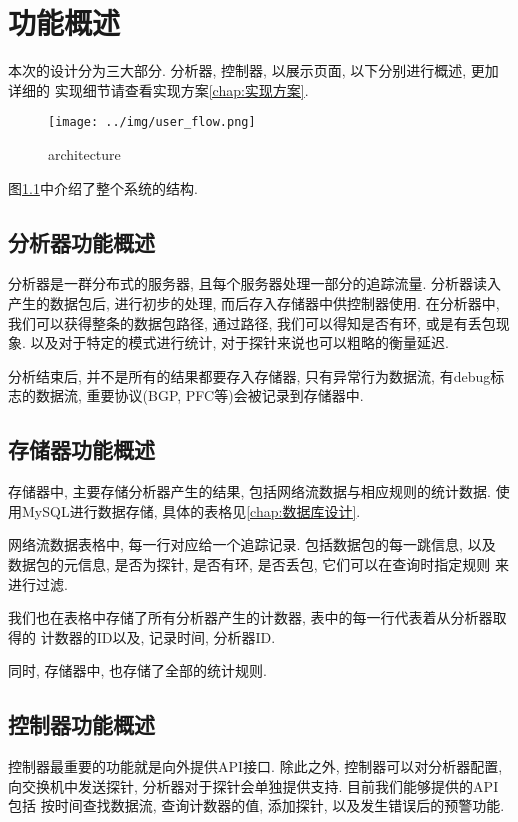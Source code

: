 \chapter{功能概述}

本次的设计分为三大部分. 分析器, 控制器, 以展示页面, 以下分别进行概述,
更加详细的 实现细节请查看实现方案\ref{chap:实现方案}.

\begin{figure}
  \centering
  \texttt{[image: ../img/user\_flow.png]}
  \caption{architecture}
  \label{fig:arch}
\end{figure}

图\ref{fig:arch}中介绍了整个系统的结构.

\section{分析器功能概述}

  分析器是一群分布式的服务器, 且每个服务器处理一部分的追踪流量.
  分析器读入产生的数据包后, 进行初步的处理, 而后存入存储器中供控制器使用.
在分析器中, 我们可以获得整条的数据包路径, 通过路径,
我们可以得知是否有环, 或是有丢包现象. 以及对于特定的模式进行统计,
对于探针来说也可以粗略的衡量延迟.

分析结束后, 并不是所有的结果都要存入存储器, 只有异常行为数据流,
有debug标志的数据流, 重要协议(BGP, PFC等)会被记录到存储器中.

\section{存储器功能概述}

存储器中, 主要存储分析器产生的结果, 包括网络流数据与相应规则的统计数据.
使用MySQL进行数据存储, 具体的表格见\ref{chap:数据库设计}.

  网络流数据表格中, 每一行对应给一个追踪记录. 包括数据包的每一跳信息, 以及
数据包的元信息, 是否为探针, 是否有环, 是否丢包, 它们可以在查询时指定规则
来进行过滤.

  我们也在表格中存储了所有分析器产生的计数器, 表中的每一行代表着从分析器取得的
计数器的ID以及, 记录时间, 分析器ID.

  同时, 存储器中, 也存储了全部的统计规则.


\section{控制器功能概述}

控制器最重要的功能就是向外提供API接口. 除此之外, 控制器可以对分析器配置,
向交换机中发送探针, 分析器对于探针会单独提供支持.
目前我们能够提供的API包括 按时间查找数据流, 查询计数器的值, 添加探针,
以及发生错误后的预警功能.


